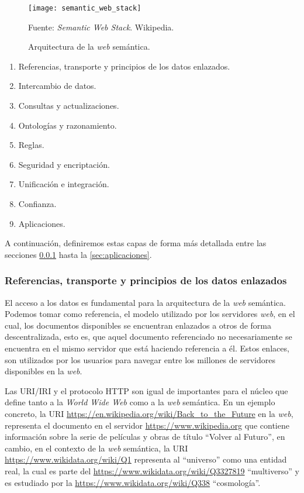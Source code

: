 \begin{figure}
    \centering
    \texttt{[image: semantic\_web\_stack]}
    \caption{Arquitectura de la \textit{web} semántica.} Fuente:
    \textit{Semantic Web Stack}. Wikipedia.
    \label{fig:semantic-web-arq}
\end{figure}

\begin{enumerate}
    \item Referencias, transporte y principios de los datos enlazados.
    \item Intercambio de datos.
    \item Consultas y actualizaciones.
    \item Ontologías y razonamiento.
    \item Reglas.
    \item Seguridad y encriptación.
    \item Unificación e integración.
    \item Confianza.
    \item Aplicaciones.
\end{enumerate}

A continuación, definiremos estas capas de forma más detallada entre las secciones
\ref{sec:refs-transporte-enlazados} hasta la \ref{sec:aplicaciones}.

\subsubsection{Referencias, transporte y principios de los datos enlazados}
\label{sec:refs-transporte-enlazados}

El acceso a los datos es fundamental para la arquitectura de la \textit{web}
semántica. Podemos tomar como referencia, el modelo utilizado por los servidores
\textit{web}, en el cual, los documentos disponibles se encuentran enlazados a
otros de forma descentralizada, esto es, que aquel documento referenciado no
necesariamente se encuentra en el mismo servidor que está haciendo referencia a
él. Estos enlaces, son utilizados por los usuarios para navegar entre los
millones de servidores disponibles en la \textit{web}.

Las URI/IRI y el protocolo HTTP son igual de importantes para el núcleo que
define tanto a la \textit{World Wide Web} como a la \textit{web} semántica. En
un ejemplo concreto, la URI
\url{https://en.wikipedia.org/wiki/Back_to_the_Future} en la \textit{web},
representa el documento en el servidor \url{https://www.wikipedia.org} que
contiene información sobre la serie de películas y obras de título ``Volver al
Futuro'', en cambio, en el contexto de la \textit{web} semántica, la URI
\url{https://www.wikidata.org/wiki/Q1} representa al ``universo'' como una
entidad real, la cual es parte del \url{https://www.wikidata.org/wiki/Q3327819}
``multiverso'' y es estudiado por la \url{https://www.wikidata.org/wiki/Q338}
``cosmología''.

